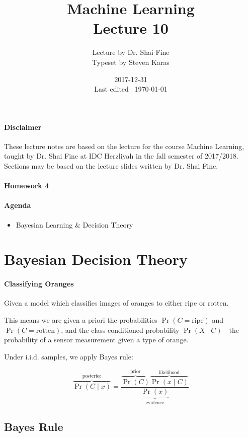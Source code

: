 \documentclass{idc_msc}
\title{Machine Learning\\\large Lecture 10}
\date{2017-12-31 \\ Last edited \currenttime\ \today}
\author{Lecture by Dr. Shai Fine\\Typeset by Steven Karas}
\begin{document}
\maketitle

\paragraph{Disclaimer}

These lecture notes are based on the lecture for the course Machine Learning, taught by Dr. Shai Fine at IDC Herzliyah in the fall semester of 2017/2018.
Sections may be based on the lecture slides written by Dr. Shai Fine.

\paragraph{Homework 4}

\paragraph{Agenda}

\begin{itemize}
  \item Bayesian Learning \& Decision Theory
\end{itemize}

\section{Bayesian Decision Theory}

\paragraph{Classifying Oranges}

Given a model which classifies images of oranges to either ripe or rotten.

This means we are given a priori the probabilities \(\Pr(C = \text{ripe})\) and \(\Pr(C = \text{rotten})\), and the class conditioned probability \(\Pr(X \mid C)\) - the probability of a sensor measurement given a type of orange.

Under i.i.d. samples, we apply Bayes rule:

\[
  \overbrace{\Pr(C\mid x)}^{\text{posterior}} = \frac{\overbrace{\Pr(C)}^{\text{prior}}\overbrace{\Pr(x \mid C)}^{\text{likelihood}}}{\underbrace{\Pr(x)}_{\text{evidence}}}
\]

\subsection{Bayes Rule}
\end{document}
